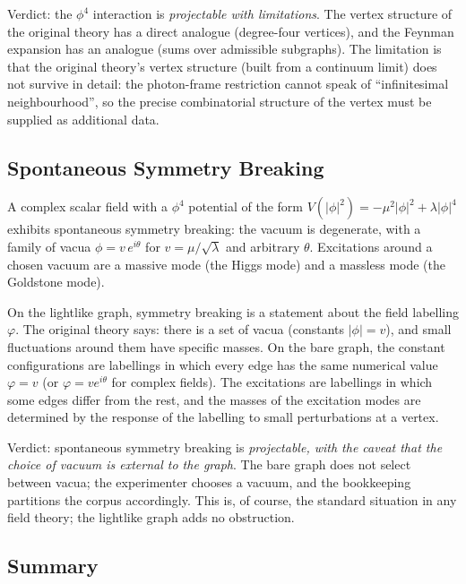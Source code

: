 \documentclass[11pt]{article}
\begin{document}
Verdict: the $\phi^4$ interaction is \emph{projectable with limitations}. The vertex structure of the original theory has a direct analogue (degree-four vertices), and the Feynman expansion has an analogue (sums over admissible subgraphs). The limitation is that the original theory's vertex structure (built from a continuum limit) does not survive in detail: the photon-frame restriction cannot speak of ``infinitesimal neighbourhood'', so the precise combinatorial structure of the vertex must be supplied as additional data.

\subsection{Spontaneous Symmetry Breaking}

A complex scalar field with a $\phi^4$ potential of the form $V(|\phi|^2) = -\mu^2 |\phi|^2 + \lambda |\phi|^4$ exhibits spontaneous symmetry breaking: the vacuum is degenerate, with a family of vacua $\phi = v\, e^{i\theta}$ for $v = \mu / \sqrt{\lambda}$ and arbitrary $\theta$. Excitations around a chosen vacuum are a massive mode (the Higgs mode) and a massless mode (the Goldstone mode).

On the lightlike graph, symmetry breaking is a statement about the field labelling $\varphi$. The original theory says: there is a set of vacua (constants $|\phi| = v$), and small fluctuations around them have specific masses. On the bare graph, the constant configurations are labellings in which every edge has the same numerical value $\varphi = v$ (or $\varphi = v e^{i \theta}$ for complex fields). The excitations are labellings in which some edges differ from the rest, and the masses of the excitation modes are determined by the response of the labelling to small perturbations at a vertex.

Verdict: spontaneous symmetry breaking is \emph{projectable, with the caveat that the choice of vacuum is external to the graph}. The bare graph does not select between vacua; the experimenter chooses a vacuum, and the bookkeeping partitions the corpus accordingly. This is, of course, the standard situation in any field theory; the lightlike graph adds no obstruction.

\subsection{Summary}
\end{document}
